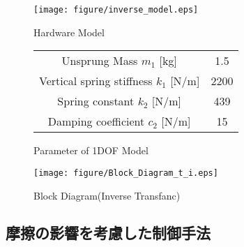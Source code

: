 \documentclass[a4paper,12pt]{article_vdlab_sotsuron}
\begin{document}
\vspace{10mm}
\begin{figure}[h]
  \begin{minipage}{0.3\hsize}
     \begin{center}
      \texttt{[image: figure/inverse\_model.eps]}
	\vspace{2mm}
      \caption{Hardware Model}
      \label{fig:1DOF}
    \end{center}
  \end{minipage}
\begin{minipage}{0.65\hsize}
\makeatletter
\def\@captype{table}
\makeatother
  \begin{center}
   \caption{Parameter of 1DOF Model}
   \label{tab:1DOF}
   \begin{tabular}{cc}\hline
      Unsprung Mass $m_1$ [kg] & 1.5  \\
      Vertical spring stiffness $k_1$ [N/m] & 2200  \\
      Spring constant $k_2$ [N/m] & 439   \\
      Damping coefficient $c_2$ [N/m] & 15   \\ \hline
    \end{tabular}
   \end{center}
 \end{minipage}
\end{figure}
\vspace*{10mm}
\begin{figure}[htp]
  \begin{center}
    \texttt{[image: figure/Block\_Diagram\_t\_i.eps]}
    \vspace*{3mm}
    \caption{Block Diagram(Inverse Transfanc)}
    \label{fig:1dof_Invere_model_block}
  \end{center}
\end{figure}

\newpage
\subsection{摩擦の影響を考慮した制御手法}
\end{document}
